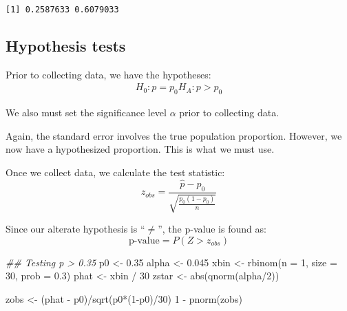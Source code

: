 \documentclass[
  letterpaper,
  DIV=11,
  numbers=noendperiod]{scrreprt}
\newenvironment{Shaded}{\begin{snugshade}}{\end{snugshade}}
\newcommand{\AttributeTok}[1]{\textcolor[rgb]{0.40,0.45,0.13}{#1}}
\newcommand{\DecValTok}[1]{\textcolor[rgb]{0.68,0.00,0.00}{#1}}
\newcommand{\DocumentationTok}[1]{\textcolor[rgb]{0.37,0.37,0.37}{\textit{#1}}}
\newcommand{\FloatTok}[1]{\textcolor[rgb]{0.68,0.00,0.00}{#1}}
\newcommand{\FunctionTok}[1]{\textcolor[rgb]{0.28,0.35,0.67}{#1}}
\newcommand{\NormalTok}[1]{\textcolor[rgb]{0.00,0.23,0.31}{#1}}
\newcommand{\OtherTok}[1]{\textcolor[rgb]{0.00,0.23,0.31}{#1}}
\newcommand{\SpecialCharTok}[1]{\textcolor[rgb]{0.37,0.37,0.37}{#1}}
\begin{document}
\begin{verbatim}
[1] 0.2587633 0.6079033
\end{verbatim}

\hypertarget{hypothesis-tests-1}{%
\subsection{Hypothesis tests}\label{hypothesis-tests-1}}

Prior to collecting data, we have the hypotheses: \begin{align*}
H_0: p = p_0
H_A: p > p_0
\end{align*}

We also must set the significance level \(\alpha\) prior to collecting
data.

Again, the standard error involves the true population proportion.
However, we now have a hypothesized proportion. This is what we must
use.

Once we collect data, we calculate the test statistic: \[
z_{obs} = \frac{\hat p - p_0}{\sqrt{\frac{p_0(1-p_0)}{n}}}
\]

Since our alterate hypothesis is ``\(\ne\)'', the p-value is found as:
\[
\text{p-value} = P(Z > z_{obs})
\]

\begin{Shaded}
\begin{Highlighting}[]
\DocumentationTok{\#\# Testing p \textgreater{} 0.35}
\NormalTok{p0 }\OtherTok{\textless{}{-}} \FloatTok{0.35}
\NormalTok{alpha }\OtherTok{\textless{}{-}} \FloatTok{0.045}
\NormalTok{xbin }\OtherTok{\textless{}{-}} \FunctionTok{rbinom}\NormalTok{(}\AttributeTok{n =} \DecValTok{1}\NormalTok{, }\AttributeTok{size =} \DecValTok{30}\NormalTok{, }\AttributeTok{prob =} \FloatTok{0.3}\NormalTok{)}
\NormalTok{phat }\OtherTok{\textless{}{-}}\NormalTok{ xbin }\SpecialCharTok{/} \DecValTok{30}
\NormalTok{zstar }\OtherTok{\textless{}{-}} \FunctionTok{abs}\NormalTok{(}\FunctionTok{qnorm}\NormalTok{(alpha}\SpecialCharTok{/}\DecValTok{2}\NormalTok{))}

\NormalTok{zobs }\OtherTok{\textless{}{-}}\NormalTok{ (phat }\SpecialCharTok{{-}}\NormalTok{ p0)}\SpecialCharTok{/}\FunctionTok{sqrt}\NormalTok{(p0}\SpecialCharTok{*}\NormalTok{(}\DecValTok{1}\SpecialCharTok{{-}}\NormalTok{p0)}\SpecialCharTok{/}\DecValTok{30}\NormalTok{)}
\DecValTok{1} \SpecialCharTok{{-}} \FunctionTok{pnorm}\NormalTok{(zobs)}
\end{Highlighting}
\end{Shaded}
\end{document}
